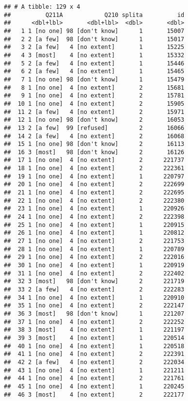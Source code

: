 \documentclass[]{article}
\begin{document}
\begin{verbatim}
## # A tibble: 129 x 4
##          Q211A            Q210 splita          id
##      <dbl+lbl>       <dbl+lbl>  <dbl>       <dbl>
##   1 1 [no one] 98 [don't know]      1       15007
##   2 2 [a few]  98 [don't know]      1       15017
##   3 2 [a few]   4 [no extent]       1       15225
##   4 3 [most]    4 [no extent]       1       15332
##   5 2 [a few]   4 [no extent]       1       15446
##   6 2 [a few]   4 [no extent]       1       15465
##   7 1 [no one] 98 [don't know]      1       15479
##   8 1 [no one]  4 [no extent]       2       15681
##   9 1 [no one]  4 [no extent]       2       15781
##  10 1 [no one]  4 [no extent]       2       15905
##  11 2 [a few]   4 [no extent]       2       15971
##  12 1 [no one] 98 [don't know]      2       16053
##  13 2 [a few]  99 [refused]         2       16066
##  14 2 [a few]   4 [no extent]       2       16068
##  15 1 [no one] 98 [don't know]      2       16113
##  16 3 [most]   98 [don't know]      2       16126
##  17 1 [no one]  4 [no extent]       2      221737
##  18 1 [no one]  4 [no extent]       2      222361
##  19 1 [no one]  4 [no extent]       1      220797
##  20 1 [no one]  4 [no extent]       2      222699
##  21 1 [no one]  4 [no extent]       2      222695
##  22 1 [no one]  4 [no extent]       2      222380
##  23 1 [no one]  4 [no extent]       1      220926
##  24 1 [no one]  4 [no extent]       2      222398
##  25 1 [no one]  4 [no extent]       1      220915
##  26 1 [no one]  4 [no extent]       1      220812
##  27 1 [no one]  4 [no extent]       2      221753
##  28 1 [no one]  4 [no extent]       1      220789
##  29 1 [no one]  4 [no extent]       2      222016
##  30 1 [no one]  4 [no extent]       1      220919
##  31 1 [no one]  4 [no extent]       2      222402
##  32 3 [most]   98 [don't know]      2      221719
##  33 2 [a few]   4 [no extent]       2      222283
##  34 1 [no one]  4 [no extent]       1      220910
##  35 1 [no one]  4 [no extent]       2      222147
##  36 3 [most]   98 [don't know]      1      221207
##  37 1 [no one]  4 [no extent]       2      222252
##  38 3 [most]    4 [no extent]       1      221197
##  39 3 [most]    4 [no extent]       1      220514
##  40 1 [no one]  4 [no extent]       1      220518
##  41 1 [no one]  4 [no extent]       2      222391
##  42 2 [a few]   4 [no extent]       2      222034
##  43 1 [no one]  4 [no extent]       1      221211
##  44 1 [no one]  4 [no extent]       2      221761
##  45 1 [no one]  4 [no extent]       1      220245
##  46 3 [most]    4 [no extent]       2      222177

\end{verbatim}
\end{document}
